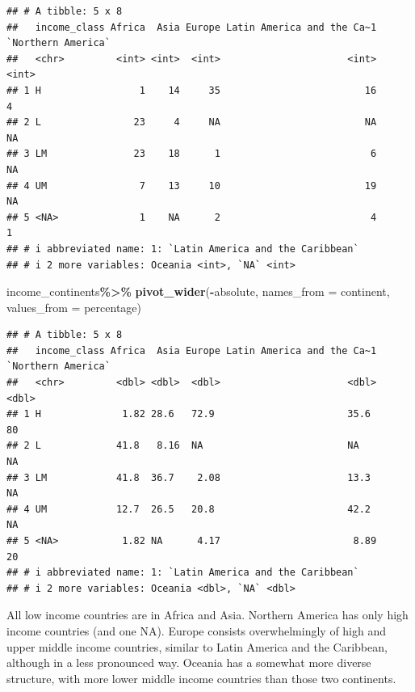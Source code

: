 \documentclass[
]{article}
\newenvironment{Shaded}{\begin{snugshade}}{\end{snugshade}}
\newcommand{\AttributeTok}[1]{\textcolor[rgb]{0.13,0.29,0.53}{#1}}
\newcommand{\FunctionTok}[1]{\textcolor[rgb]{0.13,0.29,0.53}{\textbf{#1}}}
\newcommand{\NormalTok}[1]{#1}
\newcommand{\SpecialCharTok}[1]{\textcolor[rgb]{0.81,0.36,0.00}{\textbf{#1}}}
\begin{document}
\begin{verbatim}
## # A tibble: 5 x 8
##   income_class Africa  Asia Europe Latin America and the Ca~1 `Northern America`
##   <chr>         <int> <int>  <int>                      <int>              <int>
## 1 H                 1    14     35                         16                  4
## 2 L                23     4     NA                         NA                 NA
## 3 LM               23    18      1                          6                 NA
## 4 UM                7    13     10                         19                 NA
## 5 <NA>              1    NA      2                          4                  1
## # i abbreviated name: 1: `Latin America and the Caribbean`
## # i 2 more variables: Oceania <int>, `NA` <int>
\end{verbatim}

\begin{Shaded}
\begin{Highlighting}[]
\NormalTok{income\_continents}\SpecialCharTok{\%\textgreater{}\%}
  \FunctionTok{pivot\_wider}\NormalTok{(}\SpecialCharTok{{-}}\NormalTok{absolute, }\AttributeTok{names\_from =}\NormalTok{ continent, }\AttributeTok{values\_from =}\NormalTok{ percentage)}
\end{Highlighting}
\end{Shaded}

\begin{verbatim}
## # A tibble: 5 x 8
##   income_class Africa  Asia Europe Latin America and the Ca~1 `Northern America`
##   <chr>         <dbl> <dbl>  <dbl>                      <dbl>              <dbl>
## 1 H              1.82 28.6   72.9                       35.6                  80
## 2 L             41.8   8.16  NA                         NA                    NA
## 3 LM            41.8  36.7    2.08                      13.3                  NA
## 4 UM            12.7  26.5   20.8                       42.2                  NA
## 5 <NA>           1.82 NA      4.17                       8.89                 20
## # i abbreviated name: 1: `Latin America and the Caribbean`
## # i 2 more variables: Oceania <dbl>, `NA` <dbl>
\end{verbatim}

All low income countries are in Africa and Asia. Northern America has
only high income countries (and one NA). Europe consists overwhelmingly
of high and upper middle income countries, similar to Latin America and
the Caribbean, although in a less pronounced way. Oceania has a somewhat
more diverse structure, with more lower middle income countries than
those two continents.
\end{document}
